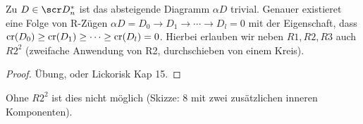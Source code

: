 \begin{lem}
    Zu $D \in \scr D_n^*$ ist das absteigende Diagramm $\alpha D$ trivial.
    Genauer existieret eine Folge von R-Zügen
    \begin{math}
        \alpha D = D_0 \to D_1 \to \dotsb \to D_l = 0
    \end{math}
    mit der Eigenschaft, dass $\operatorname{cr}(D_0) \ge \operatorname{cr}(D_1) \ge \dotsb \ge \operatorname{cr}(D_l) = 0$.
    Hierbei erlauben wir neben $R1, R2, R3$ auch $R2^2$ (zweifache Anwendung von R2, durchschieben von einem Kreis).
    \begin{proof}
        Übung, oder Lickorisk Kap 15.
    \end{proof}
    \begin{note}
        Ohne $R2^2$ ist dies nicht möglich (Skizze: 8 mit zwei zusätzlichen inneren Komponenten).
    \end{note}
\end{lem}









